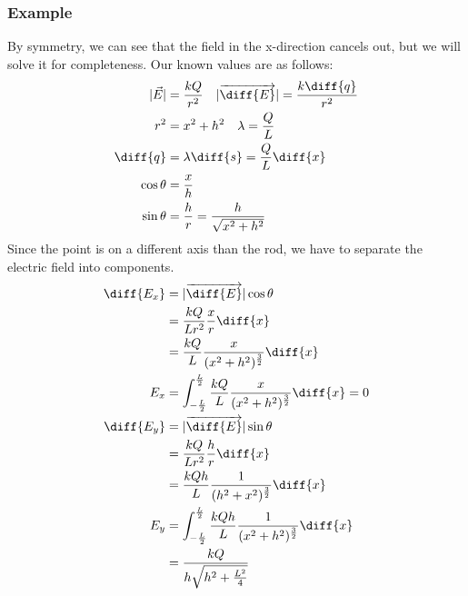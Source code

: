 \documentclass{math}
\begin{document}
\subsubsection*{Example}
\begin{center}
\end{center}
By symmetry, we can see that the field in the x-direction cancels out, but we
will solve it for completeness. Our known values are as follows:
\begin{align*}
  |\vec{E}| &= \frac{kQ}{r^2} \quad
    |\overrightarrow{\diff{E}}| = \frac{k\diff{q}}{r^2} \\
  r^2 &= x^2+h^2 \quad \lambda = \frac{Q}{L} \quad \\
  \diff{q} &= \lambda\diff{s} = \frac{Q}{L}\diff{x} \\
  \cos\theta &= \frac{x}{h} \\
  \sin\theta &= \frac{h}{r} = \frac{h}{\sqrt{x^2+h^2}}
\end{align*}
Since the point is on a different axis than the rod, we have to separate the
electric field into components.
\begin{align*}
  \diff{E_x} &= |\overrightarrow{\diff{E}}|\cos\theta \\
  &= \frac{kQ}{Lr^2}\frac{x}{r}\diff{x} \\
  &= \frac{kQ}{L}\frac{x}{(x^2+h^2)^{\frac{3}{2}}}\diff{x} \\
  E_x &= \int_{-\frac{L}{2}}^{\frac{L}{2}}
    \frac{kQ}{L}\frac{x}{(x^2+h^2)^{\frac{3}{2}}}\diff{x} = 0 \\
  \diff{E_y} &= |\overrightarrow{\diff{E}}|\sin\theta \\
  &= \frac{kQ}{Lr^2}\frac{h}{r}\diff{x} \\
  &= \frac{kQh}{L}\frac{1}{(h^2+x^2)^{\frac{3}{2}}}\diff{x} \\
  E_y &= \int_{-\frac{L}{2}}^{\frac{L}{2}}
    \frac{kQh}{L}\frac{1}{(x^2+h^2)^{\frac{3}{2}}}\diff{x} \\
  &= \frac{kQ}{h\sqrt{h^2+\frac{L^2}{4}}}
\end{align*}
\end{document}

